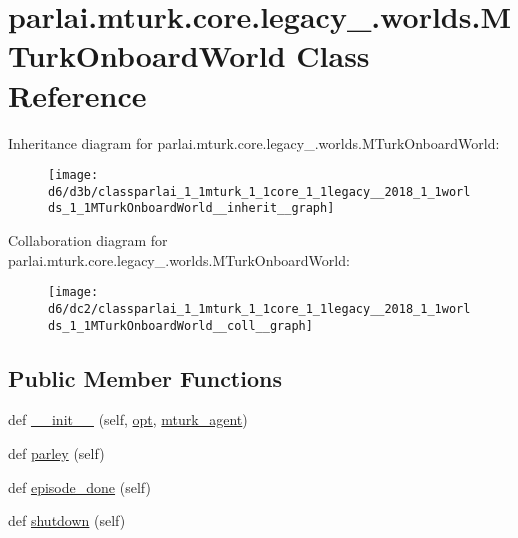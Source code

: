 \hypertarget{classparlai_1_1mturk_1_1core_1_1legacy__2018_1_1worlds_1_1MTurkOnboardWorld}{}\section{parlai.\+mturk.\+core.\+legacy\+\_.\+worlds.\+M\+Turk\+Onboard\+World Class Reference}
\label{classparlai_1_1mturk_1_1core_1_1legacy__2018_1_1worlds_1_1MTurkOnboardWorld}


Inheritance diagram for parlai.\+mturk.\+core.\+legacy\+\_.\+worlds.\+M\+Turk\+Onboard\+World\+:\nopagebreak
\begin{figure}[H]
\begin{center}
\leavevmode
\texttt{[image: d6/d3b/classparlai\_1\_1mturk\_1\_1core\_1\_1legacy\_\_2018\_1\_1worlds\_1\_1MTurkOnboardWorld\_\_inherit\_\_graph]}
\end{center}
\end{figure}


Collaboration diagram for parlai.\+mturk.\+core.\+legacy\+\_.\+worlds.\+M\+Turk\+Onboard\+World\+:\nopagebreak
\begin{figure}[H]
\begin{center}
\leavevmode
\texttt{[image: d6/dc2/classparlai\_1\_1mturk\_1\_1core\_1\_1legacy\_\_2018\_1\_1worlds\_1\_1MTurkOnboardWorld\_\_coll\_\_graph]}
\end{center}
\end{figure}
\subsection*{Public Member Functions}
\begin{DoxyCompactItemize}
\item 
def \hyperlink{classparlai_1_1mturk_1_1core_1_1legacy__2018_1_1worlds_1_1MTurkOnboardWorld_ab513ad6fb58f11f9f30f0bd73e0b6b51}{\+\_\+\+\_\+init\+\_\+\+\_\+} (self, \hyperlink{classparlai_1_1core_1_1worlds_1_1World_a3640d92718acd3e6942a28c1ab3678bd}{opt}, \hyperlink{classparlai_1_1mturk_1_1core_1_1legacy__2018_1_1worlds_1_1MTurkOnboardWorld_a434294c870fa0b31b2889eb1f384e408}{mturk\+\_\+agent})
\item 
def \hyperlink{classparlai_1_1mturk_1_1core_1_1legacy__2018_1_1worlds_1_1MTurkOnboardWorld_a02d2dcac53a40b1c84fa33c15a3f61f1}{parley} (self)
\item 
def \hyperlink{classparlai_1_1mturk_1_1core_1_1legacy__2018_1_1worlds_1_1MTurkOnboardWorld_a9cb1072a0d15ae40b90c516c2cdf08cc}{episode\+\_\+done} (self)
\item 
def \hyperlink{classparlai_1_1mturk_1_1core_1_1legacy__2018_1_1worlds_1_1MTurkOnboardWorld_aa21e33548d44bbc48c369ab571f72b0d}{shutdown} (self)
\end{DoxyCompactItemize}
